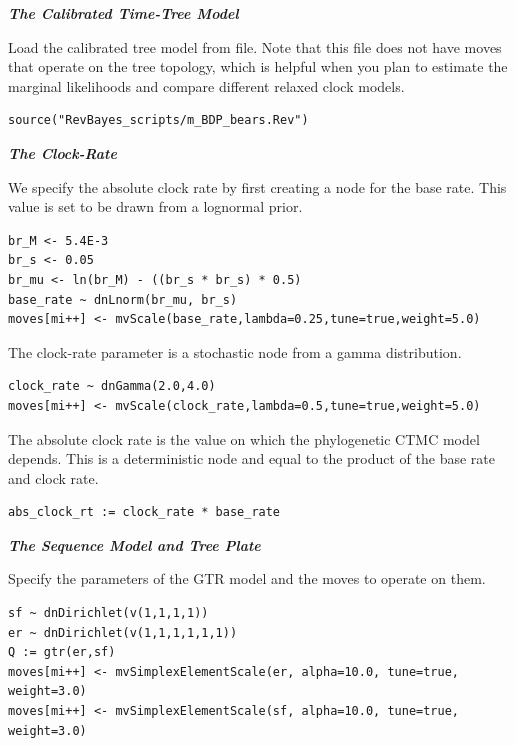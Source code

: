 \textbf{\textit{The Calibrated Time-Tree Model}}

Load the calibrated tree model from file. Note that this file does not have moves that operate on the tree topology, which is helpful when you plan to estimate the marginal likelihoods and compare different relaxed clock models.
{\tt \begin{snugshade*}
\begin{lstlisting}
source("RevBayes_scripts/m_BDP_bears.Rev")
\end{lstlisting}
\end{snugshade*}}

\textbf{\textit{The Clock-Rate}}

We specify the absolute clock rate by first creating a node for the base rate.
This value is set to be drawn from a lognormal prior.
{\tt \begin{snugshade*}
\begin{lstlisting}
br_M <- 5.4E-3
br_s <- 0.05
br_mu <- ln(br_M) - ((br_s * br_s) * 0.5)
base_rate ~ dnLnorm(br_mu, br_s)
moves[mi++] <- mvScale(base_rate,lambda=0.25,tune=true,weight=5.0)
\end{lstlisting}
\end{snugshade*}}

The clock-rate parameter is a stochastic node from a gamma distribution.
{\tt \begin{snugshade*}
\begin{lstlisting}
clock_rate ~ dnGamma(2.0,4.0)
moves[mi++] <- mvScale(clock_rate,lambda=0.5,tune=true,weight=5.0)
\end{lstlisting}
\end{snugshade*}}

The absolute clock rate is the value on which the phylogenetic CTMC model depends. This is a deterministic node and equal to the product of the base rate and clock rate.
{\tt \begin{snugshade*}
\begin{lstlisting}
abs_clock_rt := clock_rate * base_rate
\end{lstlisting}
\end{snugshade*}}

\textbf{\textit{The Sequence Model and Tree Plate}}

Specify the parameters of the GTR model and the moves to operate on them.
{\tt \begin{snugshade*}
\begin{lstlisting}
sf ~ dnDirichlet(v(1,1,1,1))
er ~ dnDirichlet(v(1,1,1,1,1,1))
Q := gtr(er,sf)
moves[mi++] <- mvSimplexElementScale(er, alpha=10.0, tune=true, weight=3.0)
moves[mi++] <- mvSimplexElementScale(sf, alpha=10.0, tune=true, weight=3.0)
\end{lstlisting}
\end{snugshade*}}

